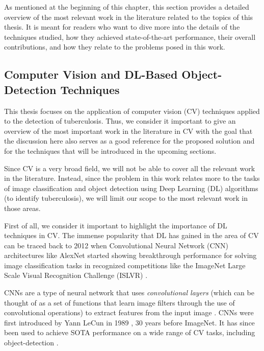 \documentclass[../main.tex]{subfiles}
\begin{document}
    As mentioned at the beginning of this chapter, this section provides a detailed overview of the most relevant work in the literature related to the topics of this thesis. It is meant for readers who want to dive more into the details of the techniques studied, how they achieved state-of-the-art performance, their overall contributions, and how they relate to the problems posed in this work.

    \subsection{Computer Vision and DL-Based Object-Detection Techniques } \label{sec:computer_vision_sota}

    This thesis focuses on the application of computer vision (CV) techniques applied to the detection of tuberculosis. Thus, we consider it important to give an overview of the most important work in the literature in CV with the goal that the discussion here also serves as a good reference for the proposed solution and for the techniques that will be introduced in the upcoming sections. 
    
    Since CV is a very broad field, we will not be able to cover all the relevant work in the literature. Instead, since the problem in this work relates more to the tasks of image classification and object detection using Deep Learning (DL) algorithms (to identify tuberculosis), we will limit our scope to the most relevant work in those areas.

    First of all, we consider it important to highlight the importance of DL techniques in CV. The immense popularity that DL has gained in the area of CV can be traced back to 2012 when Convolutional Neural Network (CNN) architectures like AlexNet \cite{dengImageNetLargescaleHierarchical2009} started showing breakthrough performance for solving image classification tasks in recognized competitions like the ImageNet Large Scale Visual Recognition Challenge (ISLVR) \cite{krizhevskyImageNetClassificationDeep2012}.
    
    CNNs are a type of neural network that uses \textit{convolutional layers} (which can be thought of as a set of functions that learn image filters through the use of convolutional operations) to extract features from the input image \autocite{goodfellowDeepLearning2016}. CNNs were first introduced by Yann LeCun in 1989 \cite{lecunBackpropagationAppliedHandwritten1989}, 30 years before ImageNet. It has since been used to achieve SOTA performance on a wide range of CV tasks, including object-detection \cite{lecun_deep_2015,zouObjectDetection202023b}.
\end{document}

